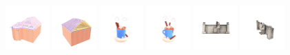 \begin{figure}[htbp]
  \includegraphics[width=0.15\textwidth]{images/data/samples/19.1.jpeg}\hspace{0.01\textwidth}%
  \includegraphics[width=0.15\textwidth]{images/data/samples/19.2.jpeg}\hfill
  \includegraphics[width=0.15\textwidth]{images/data/samples/20.1.jpeg}\hspace{0.01\textwidth}%
  \includegraphics[width=0.15\textwidth]{images/data/samples/20.2.jpeg}\hfill
  \includegraphics[width=0.15\textwidth]{images/data/samples/21.1.jpeg}\hspace{0.01\textwidth}%
  \includegraphics[width=0.15\textwidth]{images/data/samples/21.2.jpeg} \\
  \vspace{2mm}


\end{figure}
